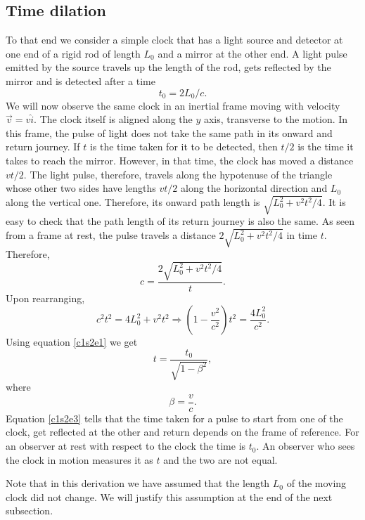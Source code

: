 \subsection{Time dilation}
To that end we consider a simple clock that has a light source and detector
at one end of a rigid rod of length $L_0$ and a mirror at the other end. A light
pulse emitted by the source travels up the length of the rod, gets reflected
by the mirror and is detected after a time 
\begin{equation}\label{c1s2e1}
t_0 = 2L_0/c.
\end{equation}
We will now observe the same clock in an inertial frame moving with velocity 
$\vec{v} = v\hat{i}$.  The clock itself is aligned along the $y$ axis, 
transverse to the motion.  In this frame, the pulse of light does not take the 
same path in its onward and return journey. If $t$ is the time taken for it to 
be detected, then $t/2$ is the time it takes to reach the mirror. However, in 
that time, the clock has moved a distance $vt/2$. The light pulse, therefore, 
travels along the hypotenuse of the triangle whose other two sides have lengths $vt/2$ along the horizontal direction and $L_0$ along the vertical one. 
Therefore, its onward path length is $\sqrt{L_0^2 + v^2t^2/4}$. It is easy to 
check that the path length of its return journey is also the same. As seen 
from a frame at rest, the pulse travels a distance $2\sqrt{L_0^2 + v^2t^2/4}$ 
in time $t$. Therefore,
\begin{equation}\label{c1s2e2}
c = \frac{2\sqrt{L_0^2 + v^2t^2/4}}{t}.
\end{equation}
Upon rearranging,
\[
c^2t^2 = 4L_0^2 + v^2t^2 \Rightarrow \left(1 - \frac{v^2}{c^2}\right)t^2 = 
\frac{4L_0^2}{c^2}.
\]
Using equation \eqref{c1s2e1} we get
\begin{equation}\label{c1s2e3}
t = \frac{t_0}{\sqrt{1 - \beta^2}},
\end{equation}
where
\begin{equation}\label{c1s2e4}
\beta = \frac{v}{c}.
\end{equation}
Equation \eqref{c1s2e3} tells that the time taken for a pulse to start from
one of the clock, get reflected at the other and return depends on the frame 
of reference. For an observer at rest with respect to the clock the time is 
$t_0$. An observer who sees the clock in motion measures it as $t$ and the two
are not equal.

Note that in this derivation we have assumed that the length $L_0$ of the 
moving clock did not change. We will justify this assumption at the end of the
next subsection.

